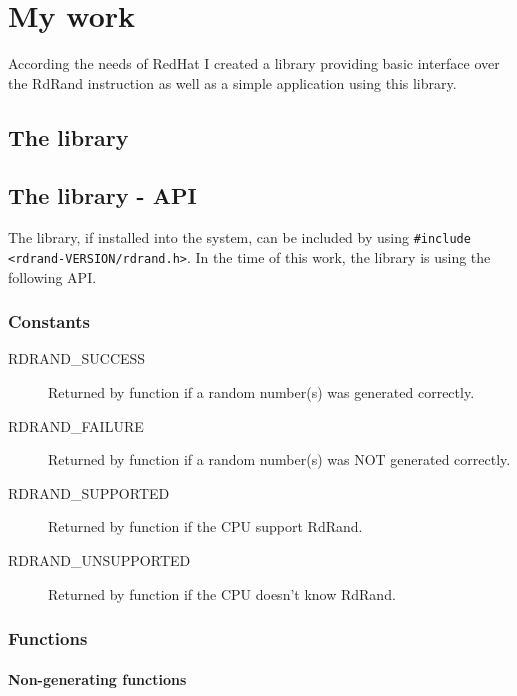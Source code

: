 
\chapter{My work} \label{sec:my-work}
According the needs of RedHat I created a library providing basic interface over the RdRand instruction as well as a simple application using this library.


\section{The library}  \label{sec:library}


\section{The library - API} \label{sec:library-api}
The library, if installed into the system, can be included by using {\tt \#include <rdrand-VERSION/rdrand.h>}. In the time of this work, the library is using the following API.

\subsection{Constants}
\begin{description}
  \item[RDRAND\_SUCCESS] Returned by function if a random number(s) was generated correctly.
  \item[RDRAND\_FAILURE] Returned by function if a random number(s) was NOT generated correctly.
  \item[RDRAND\_SUPPORTED] Returned by  function if the CPU support RdRand.
  \item[RDRAND\_UNSUPPORTED] Returned by  function if the CPU doesn't know RdRand.
  
\end{description}


\subsection{Functions}

\subsubsection{Non-generating functions}

